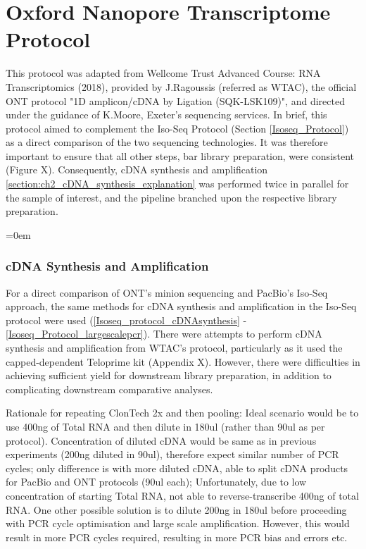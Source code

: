 \chapter{Oxford Nanopore Transcriptome Protocol}


This protocol was adapted from Wellcome Trust Advanced Course: RNA Transcriptomics (2018), provided by J.Ragoussis (referred as WTAC), the official ONT protocol "1D amplicon/cDNA by Ligation (SQK-LSK109)", and directed under the guidance of K.Moore, Exeter's sequencing services. In brief, this protocol aimed to complement the Iso-Seq Protocol (Section \ref{Isoseq_Protocol}) as a direct comparison of the two sequencing technologies. It was therefore important to ensure that all other steps, bar library preparation, were consistent (Figure X). Consequently, cDNA synthesis and amplification \ref{section:ch2_cDNA_synthesis_explanation} was performed twice in parallel for the sample of interest, and the pipeline branched upon the respective library preparation.   

\begingroup
\parindent=0em
\localtableofcontents 
\endgroup

\subsection{cDNA Synthesis and Amplification}
For a direct comparison of ONT's minion sequencing and PacBio's Iso-Seq approach, the same methods for cDNA synthesis and amplification in the Iso-Seq protocol were used (\cref{Isoseq_protocol_cDNAsynthesis} - \cref{Isoseq_Protocol_largescalepcr}). There were attempts to perform cDNA synthesis and amplification from WTAC's protocol, particularly as it used the capped-dependent Teloprime kit (Appendix X). However, there were difficulties in achieving sufficient yield for downstream library preparation, in addition to complicating downstream comparative analyses.

Rationale for repeating ClonTech 2x and then pooling: Ideal scenario would be to use 400ng of Total RNA and then dilute in 180ul (rather than 90ul as per protocol). Concentration of diluted cDNA would be same as in previous experiments (200ng diluted in 90ul), therefore expect similar number of PCR cycles; only difference is with more diluted cDNA, able to split cDNA products for PacBio and ONT protocols (90ul each); Unfortunately, due to low concentration of starting Total RNA, not able to reverse-transcribe 400ng of total RNA. One other possible solution is to dilute 200ng in 180ul before proceeding with PCR cycle optimisation and large scale amplification. However, this would result in more PCR cycles required, resulting in more PCR bias and errors etc.   

